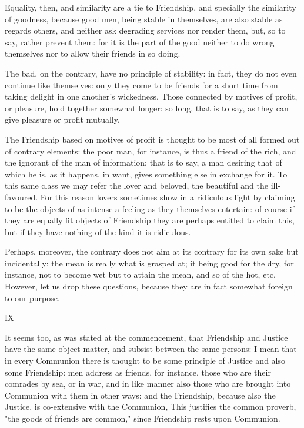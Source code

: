 Equality, then, and similarity are a tie to Friendship, and specially
the similarity of goodness, because good men, being stable in
themselves, are also stable as regards others, and neither ask degrading
services nor render them, but, so to say, rather prevent them: for it is
the part of the good neither to do wrong themselves nor to allow their
friends in so doing.

The bad, on the contrary, have no principle of stability: in fact, they
do not even continue like themselves: only they come to be friends for
a short time from taking delight in one another's wickedness. Those
connected by motives of profit, or pleasure, hold together somewhat
longer: so long, that is to say, as they can give pleasure or profit
mutually.

The Friendship based on motives of profit is thought to be most of all
formed out of contrary elements: the poor man, for instance, is thus a
friend of the rich, and the ignorant of the man of information; that
is to say, a man desiring that of which he is, as it happens, in want,
gives something else in exchange for it. To this same class we may refer
the lover and beloved, the beautiful and the ill-favoured. For this
reason lovers sometimes show in a ridiculous light by claiming to be the
objects of as intense a feeling as they themselves entertain: of course
if they are equally fit objects of Friendship they are perhaps entitled
to claim this, but if they have nothing of the kind it is ridiculous.

Perhaps, moreover, the contrary does not aim at its contrary for its own
sake but incidentally: the mean is really what is grasped at; it being
good for the dry, for instance, not to become wet but to attain the
mean, and so of the hot, etc. However, let us drop these questions,
because they are in fact somewhat foreign to our purpose.

IX

It seems too, as was stated at the commencement, that Friendship and
Justice have the same object-matter, and subsist between the same
persons: I mean that in every Communion there is thought to be some
principle of Justice and also some Friendship: men address as friends,
for instance, those who are their comrades by sea, or in war, and in
like manner also those who are brought into Communion with them in other
ways: and the Friendship, because also the Justice, is co-extensive with
the Communion, This justifies the common proverb, "the goods of friends
are common," since Friendship rests upon Communion.

